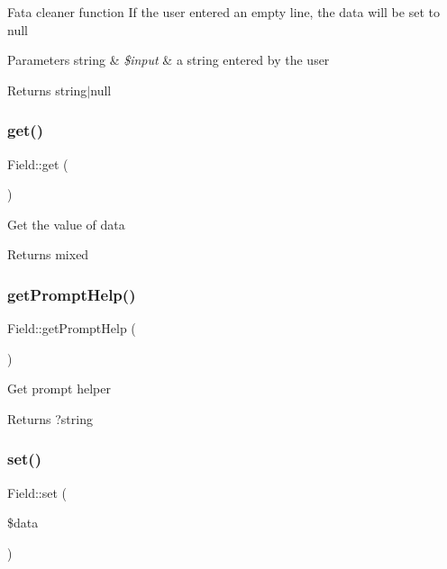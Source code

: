 Fata cleaner function If the user entered an empty line, the data will be set to null 
\begin{DoxyParams}[1]{Parameters}
string & {\em \$input} & a string entered by the user \\
\hline
\end{DoxyParams}
\begin{DoxyReturn}{Returns}
string$\vert$null 
\end{DoxyReturn}
\mbox{\label{classField_a0256105b39f3e33f4a52ec0dabca6369}} 
\subsubsection{\texorpdfstring{get()}{get()}}
{\footnotesize\ttfamily Field\+::get (\begin{DoxyParamCaption}{ }\end{DoxyParamCaption})}

Get the value of data

\begin{DoxyReturn}{Returns}
mixed 
\end{DoxyReturn}
\mbox{\label{classField_a0a70ba06268a998a95875ab373c981c8}} 
\subsubsection{\texorpdfstring{get\+Prompt\+Help()}{getPromptHelp()}}
{\footnotesize\ttfamily Field\+::get\+Prompt\+Help (\begin{DoxyParamCaption}{ }\end{DoxyParamCaption})}

Get prompt helper

\begin{DoxyReturn}{Returns}
?string 
\end{DoxyReturn}
\mbox{\label{classField_a0c9ef207aaf0de57c8f4a0a96a25d5e4}} 
\subsubsection{\texorpdfstring{set()}{set()}}
{\footnotesize\ttfamily Field\+::set (\begin{DoxyParamCaption}\item[{}]{\$data }\end{DoxyParamCaption})}




